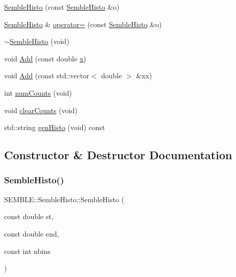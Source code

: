 \begin{DoxyCompactItemize}
\item 
\mbox{\hyperlink{structSEMBLE_1_1SembleHisto_a24d38ed2816616e275e8cb2cdc21edb6}{Semble\+Histo}} (const \mbox{\hyperlink{structSEMBLE_1_1SembleHisto}{Semble\+Histo}} \&o)
\item 
\mbox{\hyperlink{structSEMBLE_1_1SembleHisto}{Semble\+Histo}} \& \mbox{\hyperlink{structSEMBLE_1_1SembleHisto_aaf8e4bea14e23be6d8c0b77029e09d71}{operator=}} (const \mbox{\hyperlink{structSEMBLE_1_1SembleHisto}{Semble\+Histo}} \&o)
\item 
\mbox{\hyperlink{structSEMBLE_1_1SembleHisto_ac93dd11573a8cd7ad35cd753e7e7bac6}{$\sim$\+Semble\+Histo}} (void)
\item 
void \mbox{\hyperlink{structSEMBLE_1_1SembleHisto_a00b90e6db2c96fc02580cdf857918a41}{Add}} (const double \mbox{\hyperlink{old__edb_8cc_a63584b830e7aaacb521b11b72291a4bc}{x}})
\item 
void \mbox{\hyperlink{structSEMBLE_1_1SembleHisto_a98b100d47d96f0f164165367b6b97d7a}{Add}} (const std\+::vector$<$ double $>$ \&xx)
\item 
int \mbox{\hyperlink{structSEMBLE_1_1SembleHisto_a5dce2f62e09886f2fece14047d1b3601}{num\+Counts}} (void)
\item 
void \mbox{\hyperlink{structSEMBLE_1_1SembleHisto_aeadf6a191dd07c0cd8ff12f01aed7839}{clear\+Counts}} (void)
\item 
std\+::string \mbox{\hyperlink{structSEMBLE_1_1SembleHisto_afb67e49249093e2269bff75fade6a6f8}{gen\+Histo}} (void) const
\end{DoxyCompactItemize}


\subsection{Constructor \& Destructor Documentation}
\mbox{\label{structSEMBLE_1_1SembleHisto_adab30ab1f8ce4d13e7f6b58cfb29d10a}} 
\subsubsection{\texorpdfstring{SembleHisto()}{SembleHisto()}\hspace{0.1cm}{\footnotesize\ttfamily [1/4]}}
{\footnotesize\ttfamily S\+E\+M\+B\+L\+E\+::\+Semble\+Histo\+::\+Semble\+Histo (\begin{DoxyParamCaption}\item[{const double}]{st,  }\item[{const double}]{end,  }\item[{const int}]{nbins }\end{DoxyParamCaption})}

